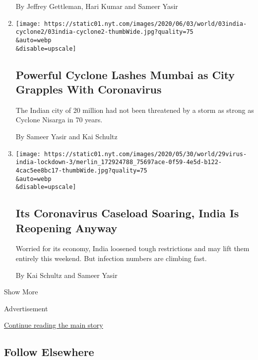 \begin{enumerate}
  By Jeffrey Gettleman, Hari Kumar and Sameer Yasir
\item
  \href{/2020/06/03/world/asia/cyclone-nisarga-india-mumbai.html}{}

  \texttt{[image: https://static01.nyt.com/images/2020/06/03/world/03india-cyclone2/03india-cyclone2-thumbWide.jpg?quality=75\\\&auto=webp\\\&disable=upscale]}

  \hypertarget{powerful-cyclone-lashes-mumbai-as-city-grapples-with-coronavirus}{%
  \subsection{Powerful Cyclone Lashes Mumbai as City Grapples With
  Coronavirus}\label{powerful-cyclone-lashes-mumbai-as-city-grapples-with-coronavirus}}

  The Indian city of 20 million had not been threatened by a storm as
  strong as Cyclone Nisarga in 70 years.

  By Sameer Yasir and Kai Schultz
\item
  \href{/2020/05/29/world/asia/coronavirus-india-lockdown.html}{}

  \texttt{[image: https://static01.nyt.com/images/2020/05/30/world/29virus-india-lockdown-3/merlin\_172924788\_75697ace-0f59-4e5d-b122-4cac5ee8bc17-thumbWide.jpg?quality=75\\\&auto=webp\\\&disable=upscale]}

  \hypertarget{its-coronavirus-caseload-soaring-india-is-reopening-anyway}{%
  \subsection{Its Coronavirus Caseload Soaring, India Is Reopening
  Anyway}\label{its-coronavirus-caseload-soaring-india-is-reopening-anyway}}

  Worried for its economy, India loosened tough restrictions and may
  lift them entirely this weekend. But infection numbers are climbing
  fast.

  By Kai Schultz and Sameer Yasir
\end{enumerate}

Show More

Advertisement

\protect\hyperlink{after-mid2}{Continue reading the main story}

\hypertarget{follow-elsewhere}{%
\subsection{Follow Elsewhere}\label{follow-elsewhere}}

